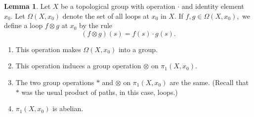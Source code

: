 \documentclass[12pt]{article}
\theoremstyle{definition}
\numberwithin{thm}{section}
\newtheorem{lem}[thm]{Lemma}
\begin{document}
\begin{lem} 
	Let $X$ be a topological group with operation $\cdot$ and identity element $x_0.$ Let $\Omega(X, x_0)$ denote the set of all loops at $x_0$ in $X.$ If $f, g \in \Omega(X, x_0),$ we define a loop $f\otimes g$ at $x_0$ by the rule
	\begin{equation*} 
		(f \otimes g)(s) = f(s)\cdot g(s).
	\end{equation*}
	\begin{enumerate}
		\item This operation makes $\Omega(X, x_0)$ into a group.
		\item This operation induces a group operation $\otimes$ on $\pi_1(X, x_0).$
		\item The two group operations $*$ and $\otimes$ on $\pi_1(X, x_0)$ are the same. (Recall that $*$ was the usual product of paths, in this case, loops.)
		\item $\pi_1(X, x_0)$ is abelian.
	\end{enumerate}
\end{lem}
\end{document}
